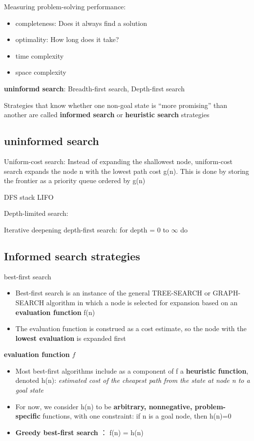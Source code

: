 \documentclass[11pt]{article}
\begin{document}
Measuring problem-solving performance: 
\begin{itemize}
\item completeness: Does it always find a solution
\item optimality: How long does it take?
\item time complexity
\item space complexity
\end{itemize}


\textbf{uninformd search}: Breadth-first search, Depth-first search


Strategies that know whether one non-goal state is “more promising” than
another are called \textbf{informed search} or \textbf{heuristic search} strategies

\subsection{uninformed search}
\label{sec:orgbc4a2ba}
Uniform-cost search: Instead of expanding the shallowest node, uniform-cost
search expands the node n with the lowest path cost g(n). This is done by
storing the frontier as a priority queue ordered by g(n)


DFS stack LIFO


Depth-limited search: 


Iterative deepening depth-first search: for depth = 0 to \(\infty\) do

\subsection{Informed search strategies}
\label{sec:orgbd1ab0d}
best-first search
\begin{itemize}
\item Best-first search is an instance of the general TREE-SEARCH or GRAPH-SEARCH
algorithm in which a node is selected for expansion based on an \textbf{evaluation
function} f(n)
\item The evaluation function is construed as a cost estimate, so the node with
the \textbf{lowest evaluation} is expanded first
\end{itemize}


\textbf{evaluation function} \(f\)
\begin{itemize}
\item Most best-first algorithms include as a component of f a \textbf{heuristic
function}, denoted h(n): \emph{estimated cost of the cheapest path from the state 
at node n to a goal state}
\item For now, we consider h(n) to be \textbf{arbitrary, nonnegative, problem-specific}
functions, with one constraint: if n is a goal node, then h(n)=0
\item \textbf{Greedy best-first search} ： f(n) = h(n)
\end{itemize}
\end{document}
